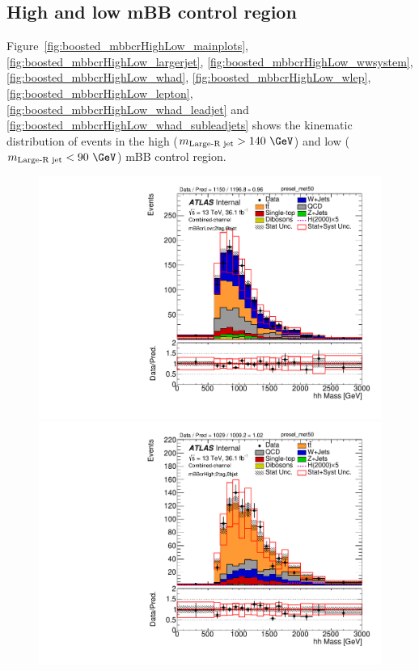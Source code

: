 \subsection{High and low mBB control region}
\label{app:boosted_mbbcontrolregion_highlow}

Figure~\ref{fig:boosted_mbbcrHighLow_mainplots}, \ref{fig:boosted_mbbcrHighLow_largerjet}, \ref{fig:boosted_mbbcrHighLow_wwsystem},
\ref{fig:boosted_mbbcrHighLow_whad}, \ref{fig:boosted_mbbcrHighLow_wlep}, \ref{fig:boosted_mbbcrHighLow_lepton}, \ref{fig:boosted_mbbcrHighLow_whad_leadjet}
and \ref{fig:boosted_mbbcrHighLow_whad_subleadjets} shows the kinematic distribution of events 
in the high ($m_\text{Large-R jet} > 140~\GeV $) and low ($m_\text{Large-R jet} < 90~\GeV $) mBB control region.

\begin{figure}[!h]
\begin{center}
\includegraphics[scale=0.33]{./figures/boosted/PlotByMbbRegions/DataMC_2tag_0bjet_mbbcrLow_lepton_presel_met50_hhMassRebin1}                                                                        
\includegraphics[scale=0.33]{./figures/boosted/PlotByMbbRegions/DataMC_2tag_0bjet_mbbcrHigh_lepton_presel_met50_hhMassRebin1}                                                                       

\end{center}
\end{figure}
